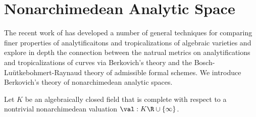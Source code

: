 \section{Nonarchimedean Analytic Space}
\label{sec:nonarchimedean-analytic-space}
    The recent work of \citet{Baker2015} has developed a number of general techniques for comparing finer properties of analytificaitons 
    and tropicalizations of algebraic varieties 
    and explore in depth the connection between 
    the natrual metrics on analytifications 
    and tropicalizations of curves 
    via Berkovich's theory 
    and the Bosch-Lu\"{u}tkebohmert-Raynaud theory of admissible 
    formal schemes. 
    We introduce Berkovich's theory of nonarchimedean analytic spaces.
    
    Let $K$ be an algebraically closed field
    that is complete with respect to a nontrivial nonarchimedean 
    valuation $\val: K \R \cup \{\infty\}$.
    